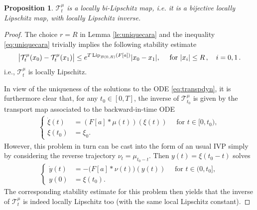 \documentclass[A4paper,11pt]{article}
\newtheorem{proposition}[theorem]{Proposition}
\theoremstyle{definition}
\newcommand{\Lip}{\textup{Lip}}
\newcommand{\ct}{\mathcal{T}}
\begin{document}
\begin{proposition}\label{p-transportlip}
$\ct^\mu_t$ is a locally bi-Lipschitz map, i.e. it is a bijective locally Lipschitz map, with locally Lipschitz inverse.
\end{proposition}
\begin{proof}
	
 The choice $r = R$ in Lemma \ref{le:uniquecara} and the inequality \eqref{eq:uniquecara} trivially implies the following stability estimate
	\begin{align}\label{eq:liptrans}
		\bigl|\ct^\mu_t(x_0)-\ct^\mu_t(x_1)\bigr|
			\leq e^{T\,\Lip_{B(0,R)}(F[a])}|x_0-x_1|,\quad \text{ for } |x_i|\leq R\,,\quad i=0,1\,.
	\end{align}
	i.e., $\ct^\mu_t$ is locally Lipschitz.
	
	In view of the uniqueness of the solutions to the ODE \eqref{eq:transpdyn}, it is furthermore clear that, for any $t_0\in [0,T]$, the inverse of $\ct^\mu_{t_0}$ is
	given by the transport map associated to the backward-in-time ODE
\begin{align*}
\left\{\begin{aligned}
\dot{\xi}(t) &= (F[a]*\mu(t))(\xi(t)) \quad \text{ for } t \in [0,t_0),\\
\xi(t_0) &= \xi_0.
\end{aligned}\right.
\end{align*}
	However, this problem in turn can be cast into the form of an usual IVP simply by considering the reverse trajectory $\nu_t=\mu_{t_0-t}$. Then
	$y(t)=\xi(t_0-t)$ solves
	\begin{align*}
	\left\{\begin{aligned}
		\dot y(t)&=-\bigl(F[a]\ast\nu(t)\bigr)(y(t))  \quad \text{ for } t \in (0,t_0], \\
		y(0) &= \xi(t_0).
	\end{aligned}\right.
	\end{align*}
	The corresponding stability estimate for this problem then yields that the inverse of $\ct^\mu_t$ is indeed
	locally Lipschitz too (with the same local Lipschitz constant).
\end{proof}
\end{document}
